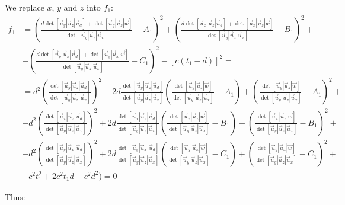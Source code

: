\documentclass[a4paper]{article}
\begin{document}
We replace $x$, $y$ and $z$ into $f_1$:
\begin{align}
f_1 &= (\frac{d\det[\vec{u}_y | \vec{u}_z | \vec{u}_d] + \det[\vec{u}_y | \vec{u}_z | \vec{w}]}{\det[\vec{u}_y | \vec{u}_z | \vec{u}_x]} - A_1)^2 + (\frac{d\det[\vec{u}_x | \vec{u}_z | \vec{u}_d] + \det[\vec{u}_x | \vec{u}_z | \vec{w}]}{\det[\vec{u}_y | \vec{u}_z | \vec{u}_x]} - B_1)^2 + \nonumber \\
&+ (\frac{d\det[\vec{u}_y | \vec{u}_x | \vec{u}_d] + \det[\vec{u}_y | \vec{u}_x | \vec{w}]}{\det[\vec{u}_y | \vec{u}_z | \vec{u}_x]} - C_1)^2 - [c(t_1 - d)]^2 = \nonumber \\
&= d^2(\frac{\det[\vec{u}_y | \vec{u}_z | \vec{u}_d]}{\det[\vec{u}_y | \vec{u}_z | \vec{u}_x]})^2 + 2d\frac{\det[\vec{u}_y | \vec{u}_z | \vec{u}_d]}{\det[\vec{u}_y | \vec{u}_z | \vec{u}_x]}(\frac{\det[\vec{u}_y | \vec{u}_z | \vec{w}]}{\det[\vec{u}_y | \vec{u}_z | \vec{u}_x]} - A_1) + (\frac{\det[\vec{u}_y | \vec{u}_z | \vec{w}]}{\det[\vec{u}_y | \vec{u}_z | \vec{u}_x]} - A_1)^2 + \nonumber\\
&+ d^2(\frac{\det[\vec{u}_x | \vec{u}_z | \vec{u}_d]}{\det[\vec{u}_y | \vec{u}_z | \vec{u}_x]})^2 + 2d\frac{\det[\vec{u}_x | \vec{u}_z | \vec{u}_d]}{\det[\vec{u}_y | \vec{u}_z | \vec{u}_x]}(\frac{\det[\vec{u}_x | \vec{u}_z | \vec{w}]}{\det[\vec{u}_y | \vec{u}_z | \vec{u}_x]} - B_1) + (\frac{\det[\vec{u}_x | \vec{u}_z | \vec{w}]}{\det[\vec{u}_y | \vec{u}_z | \vec{u}_x]} - B_1)^2 + \nonumber\\
&+ d^2(\frac{\det[\vec{u}_y | \vec{u}_x | \vec{u}_d]}{\det[\vec{u}_y | \vec{u}_z | \vec{u}_x]})^2 + 2d\frac{\det[\vec{u}_y | \vec{u}_x | \vec{u}_d]}{\det[\vec{u}_y | \vec{u}_z | \vec{u}_x]}(\frac{\det[\vec{u}_y | \vec{u}_x | \vec{w}]}{\det[\vec{u}_y | \vec{u}_z | \vec{u}_x]} - C_1) + (\frac{\det[\vec{u}_y | \vec{u}_x | \vec{w}]}{\det[\vec{u}_y | \vec{u}_z | \vec{u}_x]} - C_1)^2 + \nonumber\\
&- c^2t_1^2 + 2c^2t_1d - c^2d^2) = 0 \nonumber
\end{align}

Thus:
\end{document}
